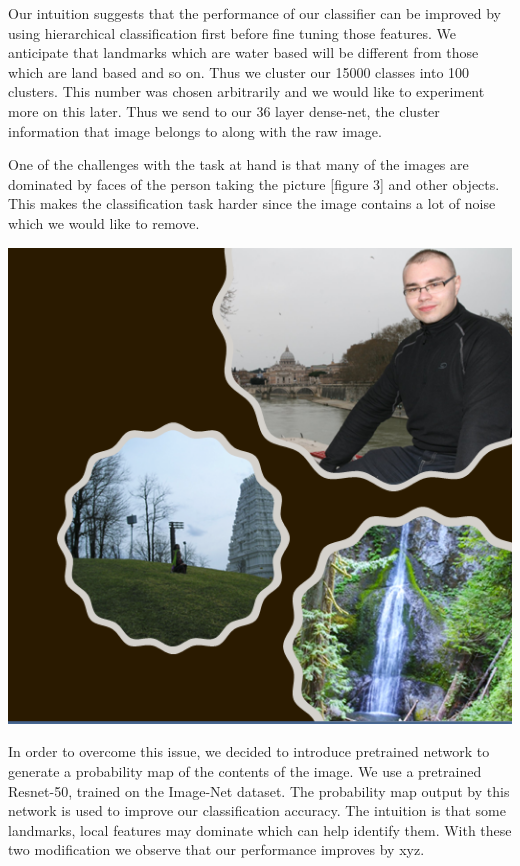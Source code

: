 \documentclass{article}
\begin{document}
Our intuition suggests that the performance of our classifier can be improved by using hierarchical classification first before fine tuning those features. We anticipate that landmarks which are water based will be different from those which are land based and so on. Thus we cluster our 15000 classes into 100 clusters. This number was chosen arbitrarily and we would like to experiment more on this later. Thus we send to our 36 layer dense-net, the cluster information that image belongs to along with the raw image.

One of the challenges with the task at hand is that many of the images are dominated by faces of the person taking the picture [figure 3] and other objects. This makes the classification task harder since the image contains a lot of noise which we would like to remove. 
\begin{center}
	\includegraphics[width=\textwidth]{problems_in_images}
\end{center} 
In order to overcome this issue, we decided to introduce pretrained network to generate a probability map of the contents of the image. We use a pretrained Resnet-50, trained on the Image-Net dataset. The probability map output by this network is used to improve our classification accuracy. The intuition is that some landmarks, local features may dominate which can help identify them. With these two modification we observe that our performance improves by xyz.
\end{document}
